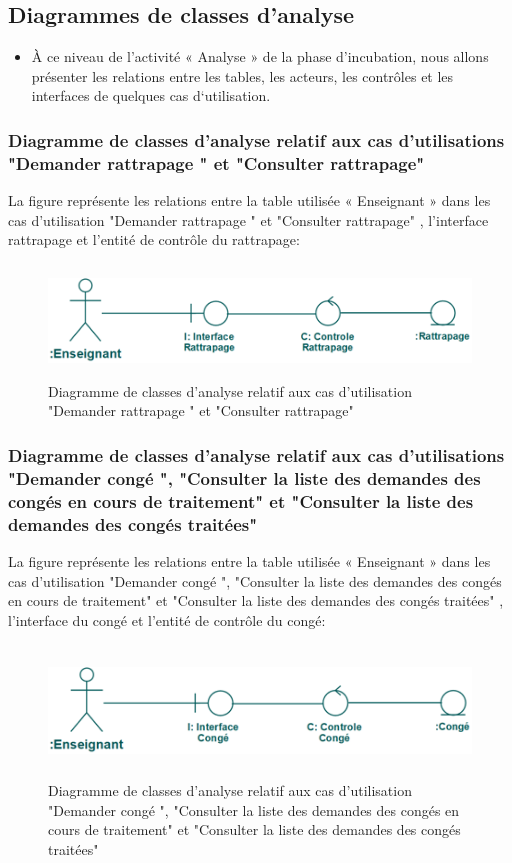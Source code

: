 \documentclass[12 pt]{report}
\begin{document}
\subsection{Diagrammes de classes d'analyse}
\begin{itemize}[font=\color{black} \Large, label=] 
\item À ce niveau de l’activité « Analyse » de la phase d’incubation, nous allons présenter les relations entre les tables, les acteurs, les contrôles et les interfaces de quelques cas d‘utilisation.
\end{itemize}
\subsubsection{Diagramme de classes d’analyse relatif aux cas d’utilisations "Demander rattrapage " et "Consulter rattrapage" }
La figure  représente les relations entre la table utilisée « Enseignant » dans les cas d’utilisation "Demander rattrapage " et "Consulter rattrapage" , l’interface  rattrapage et  l'entité de  contrôle du rattrapage:
\begin{figure}[h]
\begin{center}
\includegraphics[width= 12cm , height =3cm]{cdc.png}
\caption{Diagramme de classes d’analyse relatif aux cas d’utilisation "Demander rattrapage " et "Consulter rattrapage" }
\end{center}
\end{figure} 
\subsubsection{Diagramme de classes d’analyse relatif aux cas d’utilisations "Demander congé ", "Consulter la liste des demandes des congés en cours de traitement" et "Consulter la liste des demandes des congés traitées"}
La figure  représente les relations entre la table utilisée « Enseignant » dans les cas d’utilisation "Demander congé ", "Consulter la liste des demandes des congés en cours de traitement" et "Consulter la liste des demandes des congés traitées" , l’interface  du congé et  l'entité de  contrôle du congé:
\begin{figure}[h]
\begin{center}
\includegraphics[width= 12cm , height =3.5cm]{cdr.png}
\caption{Diagramme de classes d’analyse relatif aux cas d’utilisation "Demander congé ", "Consulter la liste des demandes des congés en cours de traitement" et "Consulter la liste des demandes des congés traitées"}
\end{center}
\end{figure}
\end{document}
